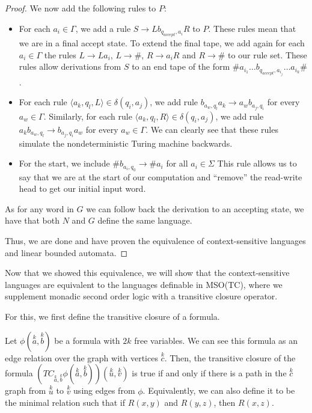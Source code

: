 \begin{proof}
    We now add the following rules to $P$:
    \begin{itemize}
        \setlength\itemsep{0.2em}
        \item For each $a_i \in \Gamma$, we add a rule $S \to Lb_{q_{accept}, a_i}R$ to $P$.
        These rules mean that we are in a final accept state.
        To extend the final tape, we add again for each $a_i \in \Gamma$ the rules $L \to La_i$, $L \to \#$, $R \to a_{i}R$ and $R \to \#$ to our rule set.
        These rules allow derivations from $S$ to an end tape of the form $\#a_{i_1}\dots b_{q_{accept}, a_{i_j}}\dots a_{i_k}\#$.
        \item For each rule $\langle a_k, q_l, L \rangle \in \delta(q_i, a_j)$, we add rule $b_{a_w, q_l}a_k \to a_{w}b_{a_j, q_i}$ for every $a_w \in \Gamma$.
        Similarly, for each rule $\langle a_k, q_l, R \rangle \in \delta(q_i, a_j)$, we add rule $a_{k}b_{a_w, q_l} \to b_{a_j, q_i}a_{w}$ for every $a_w \in \Gamma$.
        We can clearly see that these rules simulate the nondeterministic Turing machine backwards.
        \item For the start, we include $\#b_{a_i, q_0} \to \#a_i$ for all $a_i \in \Sigma$
        This rule allows us to say that we are at the start of our computation and ``remove'' the read-write head to get our initial input word.
    \end{itemize}
    As for any word in $G$ we can follow back the derivation to an accepting state, we have that both $N$ and $G$ define the same language.

    Thus, we are done and have proven the equivalence of context-sensitive languages and linear bounded automata.
\end{proof}

Now that we showed this equivalence, we will show that the context-sensitive languages are equivalent to the languages definable in MSO(TC), where we supplement monadic second order logic with a transitive closure operator.

For this, we first define the transitive closure of a formula.

\begin{define}
    Let $\phi\left(\overset{k}{a}, \overset{k}{b}\right)$ be a formula with $2k$ free variables.
    We can see this formula as an edge relation over the graph with vertices $\overset{k}{c}$.
    Then, the transitive closure of the formula $\left(TC_{\overset{k}{a}, \overset{k}{b}}\phi\left(\overset{k}{a}, \overset{k}{b}\right)\right)\left(\overset{k}{u}, \overset{k}{v}\right)$ is true if and only if there is a path in the $\overset{k}{c}$ graph from $\overset{k}{u}$ to $\overset{k}{v}$ using edges from $\phi$.
    Equivalently, we can also define it to be the minimal relation such that if $R(x, y)$ and $R(y, z)$, then $R(x, z)$.
\end{define}

